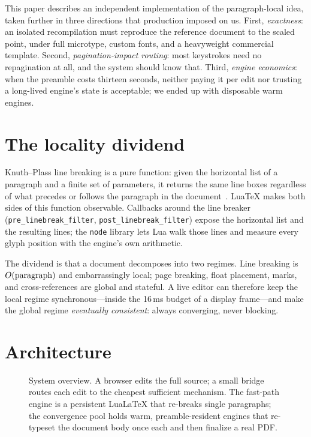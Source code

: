 \documentclass{ltugboat}
\def\LuaTeX{Lua\TeX}
\def\LuaLaTeX{Lua\LaTeX}
\begin{document}
This paper describes an independent implementation of the
paragraph-local idea, taken further in three directions that production
imposed on us. First, \emph{exactness}: an isolated recompilation must
reproduce the reference document to the scaled point, under full
\textsf{microtype}, custom fonts, and a heavyweight commercial template.
Second, \emph{pagination-impact routing}: most keystrokes need no
repagination at all, and the system should know that. Third,
\emph{engine economics}: when the preamble costs thirteen seconds, neither
paying it per edit nor trusting a long-lived engine's state is acceptable;
we ended up with disposable warm engines.

\section{The locality dividend}

Knuth--Plass line breaking is a pure function: given the horizontal list of
a paragraph and a finite set of parameters, it returns the same line boxes
regardless of what precedes or follows the paragraph in the
document~\cite{knuthplass}. \LuaTeX{} makes both sides of this function
observable. Callbacks around the line breaker
(\verb|pre_linebreak_filter|, \verb|post_linebreak_filter|) expose the
horizontal list and the resulting lines; the \verb|node| library lets Lua
walk those lines and measure every glyph position with the engine's own
arithmetic.

The dividend is that a document decomposes into two regimes. Line breaking
is $O(\hbox{paragraph})$ and embarrassingly local; page breaking, float
placement, marks, and cross-references are global and stateful. A live
editor can therefore keep the local regime synchronous---inside the
16\,ms budget of a display frame---and make the global regime
\emph{eventually consistent}: always converging, never blocking.

\section{Architecture}

\begin{figure}[t]
\centering

\caption{System overview. A browser edits the full source; a small bridge
routes each edit to the cheapest sufficient mechanism. The fast-path
engine is a persistent \LuaLaTeX{} that re-breaks single paragraphs; the
convergence pool holds warm, preamble-resident engines that re-typeset the
document body once each and then finalize a real PDF{}.}
\label{fig:arch}
\end{figure}
\end{document}
